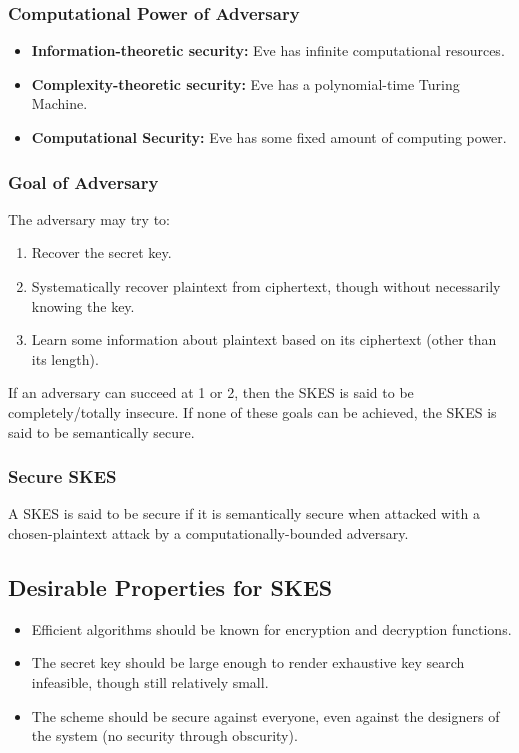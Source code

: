 \documentclass[12pt,titlepage]{article}
\begin{document}
      \subsubsection{Computational Power of Adversary}
        \begin{itemize}
          \item \textbf{Information-theoretic security:} Eve has infinite computational resources.
          \item \textbf{Complexity-theoretic security:} Eve has a polynomial-time Turing Machine.
          \item \textbf{Computational Security:} Eve has some fixed amount of computing power.
        \end{itemize}

      \subsubsection{Goal of Adversary}
        The adversary may try to:
        \begin{enumerate}
          \item Recover the secret key.
          \item Systematically recover plaintext from ciphertext, though without necessarily knowing the key.
          \item Learn some information about plaintext based on its ciphertext (other than its length).
        \end{enumerate}

        If an adversary can succeed at 1 or 2, then the SKES is said to be completely/totally insecure. If none
        of these goals can be achieved, the SKES is said to be semantically secure.

      \subsubsection{Secure SKES}
        A SKES is said to be secure if it is semantically secure when attacked with a chosen-plaintext attack
        by a computationally-bounded adversary.

    \subsection{Desirable Properties for SKES}
      \begin{itemize}
        \item Efficient algorithms should be known for encryption and decryption functions.
        \item The secret key should be large enough to render exhaustive key search infeasible, though still relatively small.
        \item The scheme should be secure against everyone, even against the designers of the system (no security through obscurity).
      \end{itemize}
\end{document}
